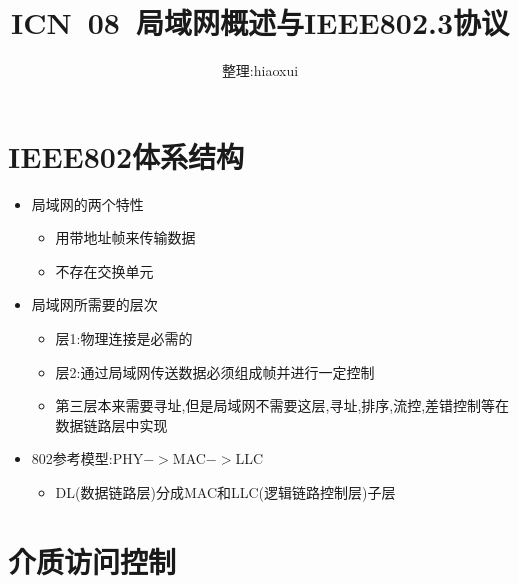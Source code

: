 \documentclass[a4paper,12pt,notitlepage]{article}
\begin{document}
\title{ICN\ 08\ 局域网概述与IEEE802.3协议}
\author{整理:hiaoxui}
\maketitle

\section{IEEE802体系结构}

\begin{itemize}
	\item 局域网的两个特性
	\begin{itemize}
		\item 用带地址帧来传输数据
		\item 不存在交换单元
	\end{itemize}
	\item 局域网所需要的层次
	\begin{itemize}
		\item 层1:物理连接是必需的
		\item 层2:通过局域网传送数据必须组成帧并进行一定控制
		\item 第三层本来需要寻址,但是局域网不需要这层,寻址,排序,流控,差错控制等在数据链路层中实现
	\end{itemize}
	\item 802参考模型:PHY$->$MAC$->$LLC
	\begin{itemize}
		\item DL(数据链路层)分成MAC和LLC(逻辑链路控制层)子层
	\end{itemize}
\end{itemize}

\section{介质访问控制}
\end{document}
